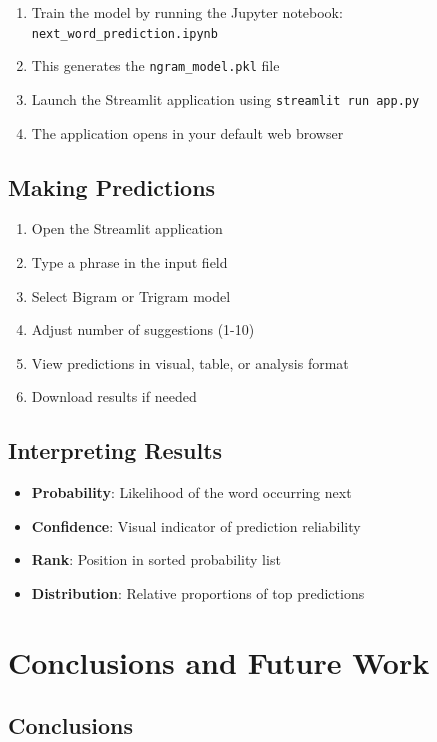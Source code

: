 \documentclass[12pt,a4paper]{report}
\begin{document}
\begin{enumerate}
    \item Train the model by running the Jupyter notebook: \texttt{next\_word\_prediction.ipynb}
    \item This generates the \texttt{ngram\_model.pkl} file
    \item Launch the Streamlit application using \texttt{streamlit run app.py}
    \item The application opens in your default web browser
\end{enumerate}

\section{Making Predictions}

\begin{enumerate}
    \item Open the Streamlit application
    \item Type a phrase in the input field
    \item Select Bigram or Trigram model
    \item Adjust number of suggestions (1-10)
    \item View predictions in visual, table, or analysis format
    \item Download results if needed
\end{enumerate}

\section{Interpreting Results}

\begin{itemize}
    \item \textbf{Probability}: Likelihood of the word occurring next
    \item \textbf{Confidence}: Visual indicator of prediction reliability
    \item \textbf{Rank}: Position in sorted probability list
    \item \textbf{Distribution}: Relative proportions of top predictions
\end{itemize}

\chapter{Conclusions and Future Work}

\section{Conclusions}
\end{document}

